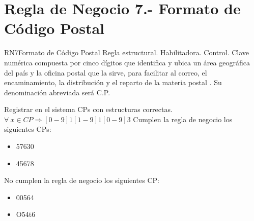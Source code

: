 \section{Regla de Negocio 7.- Formato de Código Postal}

\begin{BussinesRule}{RN7}{Formato de Código Postal}
	\BRitem[Tipo:] Regla estructural. 
	\BRitem[Clase:] Habilitadora. 
	\BRitem[Nivel:] Control. %
	\BRitem[Descripción:]Clave numérica compuesta por cinco dígitos que identifica y ubica un área geográfica del país y la oficina postal que la sirve, para facilitar al correo, el encaminamiento, la distribución y el reparto de la materia postal \cite{CP}. Su denominación abreviada será C.P.

	\BRitem[Motivación:] Registrar en el sistema CPs con estructuras correctas.
	\BRitem[Sentencia:] $\forall\ x \in CP \Rightarrow   [0-9]{1}[1-9]{1}[0-9]{3}$
	 Cumplen la regla de negocio los siguientes CPs:
        \begin{itemize}
			\item 57630
			\item 45678
        \end{itemize}
	 No cumplen la regla de negocio los siguientes CP:
		\begin{itemize}
        	\item 00564
			\item O54t6
        	
    \end{itemize}
\end{BussinesRule}




